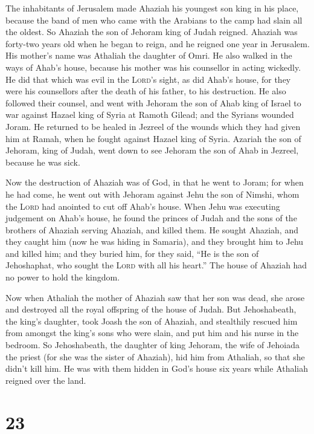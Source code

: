  The inhabitants of Jerusalem made Ahaziah his youngest
son king in his place, because the band of men who came with the
Arabians to the camp had slain all the oldest. So Ahaziah the son of
Jehoram king of Judah reigned.  Ahaziah was forty-two
years old when he began to reign, and he reigned one year in Jerusalem.
His mother's name was Athaliah the daughter of Omri.  He
also walked in the ways of Ahab's house, because his mother was his
counsellor in acting wickedly.  He did that which was evil
in the \textsc{Lord}'s sight, as did Ahab's house, for they were his
counsellors after the death of his father, to his destruction.
 He also followed their counsel, and went with Jehoram the
son of Ahab king of Israel to war against Hazael king of Syria at Ramoth
Gilead; and the Syrians wounded Joram.  He returned to be
healed in Jezreel of the wounds which they had given him at Ramah, when
he fought against Hazael king of Syria. Azariah the son of Jehoram, king
of Judah, went down to see Jehoram the son of Ahab in Jezreel, because
he was sick.

 Now the destruction of Ahaziah was of God, in that he
went to Joram; for when he had come, he went out with Jehoram against
Jehu the son of Nimshi, whom the \textsc{Lord} had anointed to cut off
Ahab's house.  When Jehu was executing judgement on Ahab's
house, he found the princes of Judah and the sons of the brothers of
Ahaziah serving Ahaziah, and killed them.  He sought
Ahaziah, and they caught him (now he was hiding in Samaria), and they
brought him to Jehu and killed him; and they buried him, for they said,
``He is the son of Jehoshaphat, who sought the \textsc{Lord} with all
his heart.'' The house of Ahaziah had no power to hold the kingdom.

 Now when Athaliah the mother of Ahaziah saw that her son
was dead, she arose and destroyed all the royal offspring of the house
of Judah.  But Jehoshabeath, the king's daughter, took
Joash the son of Ahaziah, and stealthily rescued him from amongst the
king's sons who were slain, and put him and his nurse in the bedroom. So
Jehoshabeath, the daughter of king Jehoram, the wife of Jehoiada the
priest (for she was the sister of Ahaziah), hid him from Athaliah, so
that she didn't kill him.  He was with them hidden in
God's house six years while Athaliah reigned over the land.

\hypertarget{section-22}{%
\section{23}\label{section-22}}

